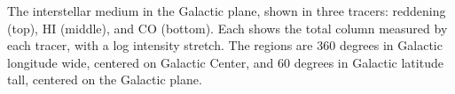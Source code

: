 The interstellar medium in the Galactic plane, shown in three tracers: reddening (top), HI (middle), and CO (bottom). Each shows the total column measured by each tracer, with a log intensity stretch. The regions are 360 degrees in Galactic longitude wide, centered on Galactic Center, and 60 degrees in Galactic latitude tall, centered on the Galactic plane.  